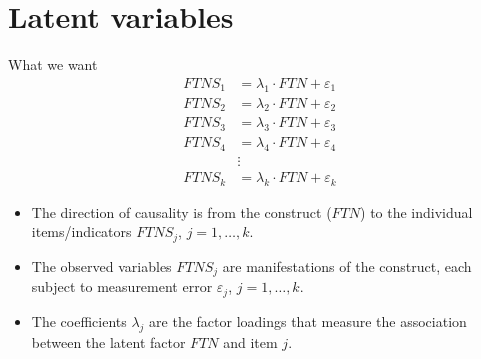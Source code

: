 \documentclass{beamer}
\begin{document}
\section{Latent variables}
\begin{frame}{What we want}
\[
\begin{aligned}
FTNS_1 &= \lambda_1 \cdot FTN + \varepsilon_1 \\
FTNS_2 &= \lambda_2 \cdot FTN + \varepsilon_2 \\
FTNS_3 &= \lambda_3 \cdot FTN + \varepsilon_3 \\
FTNS_4 &= \lambda_4 \cdot FTN + \varepsilon_4 \\
&\vdots \\
FTNS_k &= \lambda_k \cdot FTN + \varepsilon_k
\end{aligned}
\]
\begin{itemize}
  \item The direction of causality is from the construct ($FTN$) to the individual items/indicators $FTNS_j$, $j=1,\dots,k$.
  \item The observed variables $FTNS_j$ are manifestations of the construct, each subject to measurement error $\varepsilon_j$, $j=1,\dots,k$.
  \item The coefficients $\lambda_j$ are the factor loadings that measure the association between the latent factor $FTN$ and item $j$.
\end{itemize}
\end{frame}

\end{document}
